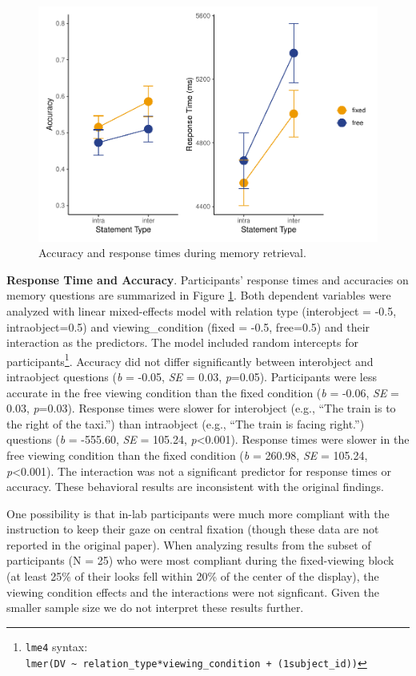 \documentclass[
  man,floatsintext]{apa6}
\begin{document}
\begin{figure}
\centering
\includegraphics{manuscript_files/figure-latex/E2-rt-acc-fig-1.pdf}
\caption{\label{fig:E2-rt-acc-fig}Accuracy and response times during memory retrieval.}
\end{figure}

\textbf{Response Time and Accuracy}. Participants' response times and accuracies on memory questions are summarized in Figure \ref{fig:E2-rt-acc-fig}.
Both dependent variables were analyzed with linear mixed-effects model with relation type (interobject = -0.5, intraobject=0.5) and viewing\_condition (fixed = -0.5, free=0.5) and their interaction as the predictors.
The model included random intercepts for participants\footnote{ \texttt{lme4} syntax: \texttt{lmer(DV\ \textasciitilde{}\ relation\_type*viewing\_condition\ +\ (1\textbar{}subject\_id))}}.
Accuracy did not differ significantly between interobject and intraobject questions (\emph{b} = -0.05, \emph{SE} = 0.03, \emph{p}=0.05). Participants were less accurate in the free viewing condition than the fixed condition (\emph{b} = -0.06, \emph{SE} = 0.03, \emph{p}=0.03).
Response times were slower for interobject (e.g., ``The train is to the right of the taxi.'') than intraobject (e.g., ``The train is facing right.'') questions (\emph{b} = -555.60, \emph{SE} = 105.24, \emph{p}\textless0.001). Response times were slower in the free viewing condition than the fixed condition (\emph{b} = 260.98, \emph{SE} = 105.24, \emph{p}\textless0.001).
The interaction was not a significant predictor for response times or accuracy.
These behavioral results are inconsistent with the original findings.

One possibility is that in-lab participants were much more compliant with the instruction to keep their gaze on central fixation (though these data are not reported in the original paper). When analyzing results from the subset of participants (N = 25) who were most compliant during the fixed-viewing block (at least 25\% of their looks fell within 20\% of the center of the display), the viewing condition effects and the interactions were not signficant. Given the smaller sample size we do not interpret these results further.
\end{document}
